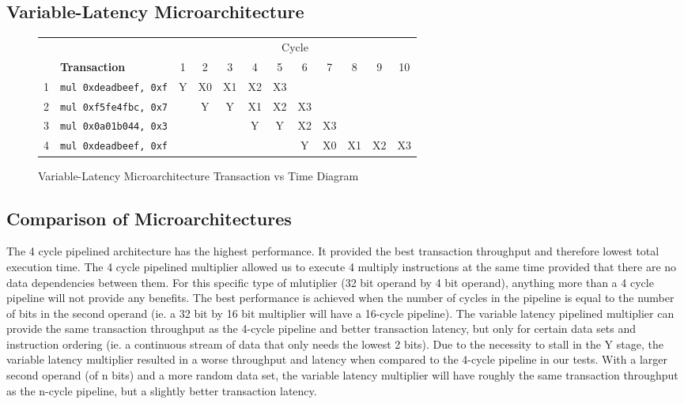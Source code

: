 \documentclass[10pt]{article}
\begin{document}
\subsection{Variable-Latency Microarchitecture}
\begin{figure}[H]
\centering
\begin{tabular}{cl|c|c|c|c|c|c|c|c|c|c}
\hline
& & \multicolumn{10}{c}{Cycle} \\
& \textbf{Transaction} & 1 & 2 & 3 & 4 & 5 & 6 & 7 & 8 & 9 & 10 \\
\hline
1 & \texttt{mul 0xdeadbeef, 0xf} & Y & X0 & X1 & X2 & X3 & & & & & \\
\hline
2 & \texttt{mul 0xf5fe4fbc, 0x7} & & Y & Y & X1 & X2 & X3 & & & & \\
\hline
3 & \texttt{mul 0x0a01b044, 0x3} & & & & Y & Y & X2 & X3 & & & \\
\hline
4 & \texttt{mul 0xdeadbeef, 0xf} & & & & & & Y & X0 & X1 & X2 & X3 \\
\hline
\end{tabular}
\caption{Variable-Latency Microarchitecture Transaction vs Time Diagram}
\label{fig:varlat_trans_diagram}
\end{figure}

\subsection{Comparison of Microarchitectures}
The 4 cycle pipelined architecture has the highest performance. It provided the best transaction throughput and therefore lowest total execution time. The 4 cycle pipelined multiplier allowed us to execute 4 multiply instructions at the same time provided that there are no data dependencies between them. For this specific type of mlutiplier (32 bit operand by 4 bit operand), anything more than a 4 cycle pipeline will not provide any benefits. The best performance is achieved when the number of cycles in the pipeline is equal to the number of bits in the second operand (ie. a 32 bit by 16 bit multiplier will have a 16-cycle pipeline). The variable latency pipelined multiplier can provide the same transaction throughput as the 4-cycle pipeline and better transaction latency, but only for certain data sets and instruction ordering (ie. a continuous stream of data that only needs the lowest 2 bits). Due to the necessity to stall in the Y stage, the variable latency multiplier resulted in a worse throughput and latency when compared to the 4-cycle pipeline in our tests. With a larger second operand (of n bits) and a more random data set, the variable latency multiplier will have roughly the same transaction throughput as the n-cycle pipeline, but a slightly better transaction latency.
\end{document}

